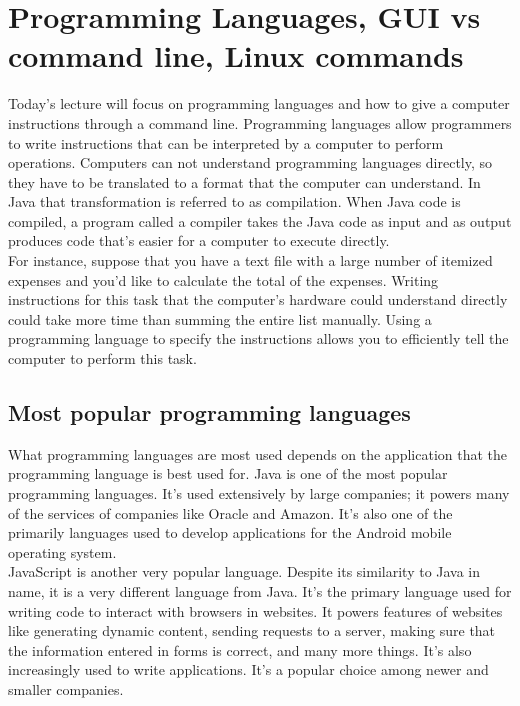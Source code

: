 \chapter{Programming Languages, GUI vs command line, Linux commands}

Today's lecture will focus on programming languages and how to give a computer instructions through a command line. Programming languages allow programmers to write instructions that can be interpreted by a computer to perform operations. Computers can not understand programming languages directly, so they have to be translated to a format that the computer can understand. In Java that transformation is referred to as compilation. When Java code is compiled, a program called a compiler takes the Java code as input and as output produces code that’s easier for a computer to execute directly. \\

For instance, suppose that you have a text file with a large number of itemized expenses and you’d like to calculate the total of the expenses. Writing instructions for this task that the computer’s hardware could understand directly could take more time than summing the entire list manually. Using a programming language to specify the instructions allows you to efficiently tell the computer to perform this task. \\ 

\section{Most popular programming languages}

What programming languages are most used depends on the application that the programming language is best used for. Java is one of the most popular programming languages. It’s used extensively by large companies; it powers many of the services of companies like Oracle and Amazon. It’s also one of the primarily languages used to develop applications for the Android mobile operating system. \\

JavaScript is another very popular language. Despite its similarity to Java in name, it is a very different language from Java. It’s the primary language used for writing code to interact with browsers in websites. It powers features of websites like generating dynamic content, sending requests to a server, making sure that the information entered in forms is correct, and many more things. It’s also increasingly used to write applications. It’s a popular choice among newer and smaller companies. \\

